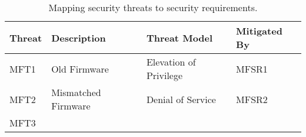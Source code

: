 \documentclass[0-thesis.tex]{subfiles}
\begin{document}
\begin{longtable}[]{@{}llll@{}}
    \caption{Mapping security threats to security requirements.}
    \label{tab:threats-to-requirements}\\
    \toprule
    \begin{minipage}[b]{0.08\columnwidth}\raggedright\strut
    Threat\strut
    \end{minipage} & \begin{minipage}[b]{0.44\columnwidth}\raggedright\strut
    Description\strut
    \end{minipage} & \begin{minipage}[b]{0.30\columnwidth}\raggedright\strut
    Threat Model\strut
    \end{minipage} & \begin{minipage}[b]{0.20\columnwidth}\raggedright\strut
    Mitigated By\strut
    \end{minipage}\tabularnewline
    \midrule
    \endhead
    \begin{minipage}[t]{0.05\columnwidth}\raggedright\strut
    MFT1\strut
    \end{minipage} & \begin{minipage}[t]{0.44\columnwidth}\raggedright\strut
    Old Firmware\strut
    \end{minipage} & \begin{minipage}[t]{0.30\columnwidth}\raggedright\strut
    Elevation of Privilege\strut
    \end{minipage} & \begin{minipage}[t]{0.09\columnwidth}\raggedright\strut
    MFSR1\strut
    \end{minipage}\tabularnewline
    \begin{minipage}[t]{0.05\columnwidth}\raggedright\strut
    MFT2\strut
    \end{minipage} & \begin{minipage}[t]{0.44\columnwidth}\raggedright\strut
    Mismatched Firmware\strut
    \end{minipage} & \begin{minipage}[t]{0.30\columnwidth}\raggedright\strut
    Denial of Service\strut
    \end{minipage} & \begin{minipage}[t]{0.09\columnwidth}\raggedright\strut
    MFSR2\strut
    \end{minipage}\tabularnewline
    \begin{minipage}[t]{0.05\columnwidth}\raggedright\strut
    MFT3\strut
    \end{minipage} & \begin{minipage}[t]{0.44\columnwidth}\raggedright\strut

\end{minipage}
\end{longtable}
\end{document}
